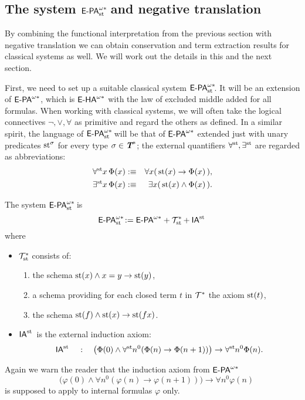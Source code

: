 \subsection{The system $\epaststar$ and negative translation}

By combining the functional interpretation from the previous section with negative translation we can obtain conservation and term extraction results for classical systems as well. We will work out the details in this and the next section.

First, we need to set up a suitable classical system $\epaststar$. It will be an extension of ${\textsf{\upshape E-PA}}^{\omega*}$, which is ${\textsf{\upshape E-HA}}^{\omega*}$ with the law of excluded middle added for all formulas. When working with classical systems, we will often take the logical connectives $\lnot, \lor, \forall$ as primitive and regard the others as defined. In a similar spirit, the language of $\epaststar$ will be that of ${\textsf{\upshape E-PA}}^{\omega*}$ extended just with unary predicates $\operatorname{st}^\sigma$ for every type $\sigma \in \emph{\protect\textbf{T}}^*$; the external quantifiers $\forall^{\operatorname{st}{}}\!, \exists^{\operatorname{st}{}}\!$ are regarded as abbreviations:
\begin{eqnarray*}
\forall^{\operatorname{st}{}}\! x \, \Phi(x) & :\equiv &  \forall x ( \, \operatorname{st}(x)\rightarrow\Phi(x) \, ),\\
\exists^{\operatorname{st}{}}\! x \, \Phi(x) & :\equiv & \exists x (\, \operatorname{st}(x)\wedge\Phi(x) \, ).
\end{eqnarray*}

\begin{dfn}[$\epaststar$] The system $\epaststar$ is
\[{\textsf{\upshape E-PA}}^{\omega*}_{\operatorname{st}{}}\! := {\textsf{\upshape E-PA}}^{\omega*} + \mathcal{T}^*_{\operatorname{st}{}}\! + \textsf{\upshape IA}^{\operatorname{st}{}} \]
where
\begin{itemize}
\item $\mathcal{T}^*_{\operatorname{st}{}}\!$ consists of:
\begin{enumerate}
\item the schema $\operatorname{st}(x) \land x = y \to \operatorname{st}(y)$,
\item a schema providing for each closed term $t$ in $\mathcal{T}^*$ the axiom $\operatorname{st}(t)$,
\item the schema $\operatorname{st}(f)\wedge\operatorname{st}(x)\rightarrow\operatorname{st}(fx)$.
\end{enumerate}
\item $ \textsf{\upshape IA}^{\operatorname{st}{}}$ is the external induction axiom:
\[
\textsf{\upshape IA}^{\operatorname{st}{}} \quad : \quad\big(\Phi(0)\wedge\forall^{\operatorname{st}{}}\! n^0 (\Phi(n)\rightarrow\Phi(n+1) )\big)\rightarrow\forall^{\operatorname{st}{}}\! n^0 \Phi(n).
\]
\end{itemize}
Again we warn the reader that the induction axiom from ${\textsf{\upshape E-PA}}^{\omega*}$
\[ \quad\big(\varphi(0)\wedge\forall n^0 (\varphi(n)\rightarrow\varphi(n+1) )\big)\rightarrow\forall n^0 \varphi(n) \]
is supposed to apply to internal formulas $\varphi$ only.
\end{dfn}

